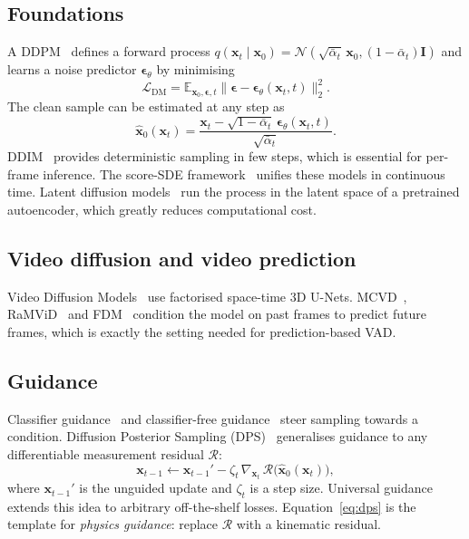 \documentclass[11pt,a4paper]{article}
\begin{document}
\subsection{Foundations}
A DDPM~\cite{ho2020ddpm} defines a forward process $q(\mathbf{x}_t\mid\mathbf{x}_0)=\mathcal{N}(\sqrt{\bar\alpha_t}\,\mathbf{x}_0,(1-\bar\alpha_t)\mathbf{I})$ and learns a noise predictor $\bm\epsilon_\theta$ by minimising
\begin{equation}
\mathcal{L}_{\text{DM}}=\mathbb{E}_{\mathbf{x}_0,\bm\epsilon,t}\big\|\bm\epsilon-\bm\epsilon_\theta(\mathbf{x}_t,t)\big\|_2^2 .
\label{eq:ddpm}
\end{equation}
The clean sample can be estimated at any step as
\begin{equation}
\hat{\mathbf{x}}_0(\mathbf{x}_t)=\frac{\mathbf{x}_t-\sqrt{1-\bar\alpha_t}\,\bm\epsilon_\theta(\mathbf{x}_t,t)}{\sqrt{\bar\alpha_t}} .
\label{eq:x0}
\end{equation}
DDIM~\cite{song2021ddim} provides deterministic sampling in few steps, which is essential for per-frame inference. The score-SDE framework~\cite{song2021score} unifies these models in continuous time. Latent diffusion models~\cite{rombach2022ldm} run the process in the latent space of a pretrained autoencoder, which greatly reduces computational cost.

\subsection{Video diffusion and video prediction}
Video Diffusion Models~\cite{ho2022video} use factorised space-time 3D U-Nets. MCVD~\cite{voleti2022mcvd}, RaMViD~\cite{hoppe2022ramvid} and FDM~\cite{harvey2022flexible} condition the model on past frames to predict future frames, which is exactly the setting needed for prediction-based VAD.

\subsection{Guidance}
Classifier guidance~\cite{dhariwal2021diffusion} and classifier-free guidance~\cite{ho2022cfg} steer sampling towards a condition. Diffusion Posterior Sampling (DPS)~\cite{chung2023dps} generalises guidance to any differentiable measurement residual $\mathcal{R}$:
\begin{equation}
\mathbf{x}_{t-1}\leftarrow\mathbf{x}_{t-1}' - \zeta_t\,\nabla_{\mathbf{x}_t}\,\mathcal{R}\big(\hat{\mathbf{x}}_0(\mathbf{x}_t)\big),
\label{eq:dps}
\end{equation}
where $\mathbf{x}_{t-1}'$ is the unguided update and $\zeta_t$ is a step size. Universal guidance~\cite{bansal2023universal} extends this idea to arbitrary off-the-shelf losses. Equation~\eqref{eq:dps} is the template for \emph{physics guidance}: replace $\mathcal{R}$ with a kinematic residual.
\end{document}
